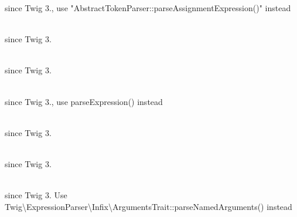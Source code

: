 \begin{DoxyRefList}
\label{deprecated__deprecated000021}%
%
since Twig 3., use "{}\+Abstract\+Token\+Parser::\+parse\+Assignment\+Expression()"{} instead  
\item[{\parbox[t]{\linewidth}{Global(e) \doxylink{class_twig_1_1_expression_parser_aa34dd7e6733af986a5d59be68e0cc24e}{Expression\+Parser::\+parse\+Filter\+Expression} (\$node)}}]\hfill \\
\label{deprecated__deprecated000018}%
%
since Twig 3.  
\item[{\parbox[t]{\linewidth}{Global(e) \doxylink{class_twig_1_1_expression_parser_a5cc9906017cdf081b15a6d02b6f2581c}{Expression\+Parser::\+parse\+Filter\+Expression\+Raw} (\$node)}}]\hfill \\
\label{deprecated__deprecated000019}%
%
since Twig 3.  
\item[{\parbox[t]{\linewidth}{Global(e) \doxylink{class_twig_1_1_expression_parser_aa1ab124f21f6eb72bdda3f835a747237}{Expression\+Parser::\+parse\+Hash\+Expression} ()}}]\hfill \\
\label{deprecated__deprecated000014}%
%
since Twig 3., use parse\+Expression() instead  
\item[{\parbox[t]{\linewidth}{Global(e) \doxylink{class_twig_1_1_expression_parser_ab615af4799d39b3141fe019395bd42a9}{Expression\+Parser::\+parse\+Mapping\+Expression} ()}}]\hfill \\
\label{deprecated__deprecated000015}%
%
since Twig 3.  
\item[{\parbox[t]{\linewidth}{Global(e) \doxylink{class_twig_1_1_expression_parser_a723d955922d5703cae23f36dcdbfdc06}{Expression\+Parser::\+parse\+Multitarget\+Expression} ()}}]\hfill \\
\label{deprecated__deprecated000022}%
%
since Twig 3.  
\item[{\parbox[t]{\linewidth}{Global(e) \doxylink{class_twig_1_1_expression_parser_a7a959294127ffd957c00f8ba1263cf55}{Expression\+Parser::\+parse\+Only\+Arguments} ()}}]\hfill \\
\label{deprecated__deprecated000023}%
%
since Twig 3. Use Twig\textbackslash{}\+Expression\+Parser\textbackslash{}\+Infix\textbackslash{}\+Arguments\+Trait::\+parse\+Named\+Arguments() instead  
\item[{\parbox[t]{\linewidth}{Global(e) \doxylink{class_twig_1_1_expression_parser_ad6aaf1c175652606d37f74ef5e008664}{Expression\+Parser::\+parse\+Postfix\+Expression} (\$node)}}]\hfill \\

\end{DoxyRefList}
